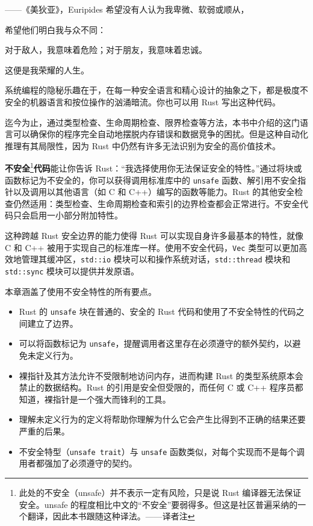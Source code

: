 
\begin{myEpigraph}{——《美狄亚》，Euripides}
希望没有人认为我卑微、软弱或顺从，

希望他们明白我与众不同：

对于敌人，我意味着危险；对于朋友，我意味着忠诚。

这便是我荣耀的人生。
\end{myEpigraph}

系统编程的隐秘乐趣在于，在每一种安全语言和精心设计的抽象之下，都是极度不安全的机器语言和按位操作的汹涌暗流。你也可以用 Rust 写出这种代码。

迄今为止，通过类型检查、生命周期检查、限界检查等方法，本书中介绍的这门语言可以确保你的程序完全自动地摆脱内存错误和数据竞争的困扰。但是这种自动化推理有其局限性，因为 Rust 中仍然有许多无法识别为安全的高价值技术。

\textbf{不安全}\footnote{此处的不安全（unsafe）并不表示一定有风险，只是说 Rust 编译器无法保证安全。unsafe 的程度相比中文的“不安全”要弱得多。但这是社区普遍采纳的一个翻译，因此本书跟随这种译法。——译者注}\textbf{代码}能让你告诉 Rust：“我选择使用你无法保证安全的特性。”通过将块或函数标记为不安全的，你可以获得调用标准库中的 \texttt{unsafe} 函数、解引用不安全指针以及调用以其他语言（如 C 和 C++）编写的函数等能力。Rust 的其他安全检查仍然适用：类型检查、生命周期检查和索引的边界检查都会正常进行。不安全代码只会启用一小部分附加特性。

这种跨越 Rust 安全边界的能力使得 Rust 可以实现自身许多最基本的特性，就像 C 和 C++ 被用于实现自己的标准库一样。使用不安全代码，\texttt{Vec} 类型可以更加高效地管理其缓冲区，\texttt{std::io} 模块可以和操作系统对话，\texttt{std::thread} 模块和 \texttt{std::sync} 模块可以提供并发原语。

本章涵盖了使用不安全特性的所有要点。

\begin{itemize}
\item Rust 的 \texttt{unsafe} 块在普通的、安全的 Rust 代码和使用了不安全特性的代码之间建立了边界。
\item 可以将函数标记为 \texttt{unsafe}，提醒调用者这里存在必须遵守的额外契约，以避免未定义行为。
\item 裸指针及其方法允许不受限制地访问内存，进而构建 Rust 的类型系统原本会禁止的数据结构。Rust 的引用是安全但受限的，而任何 C 或 C++ 程序员都知道，裸指针是一个强大而锋利的工具。
\item 理解未定义行为的定义将帮助你理解为什么它会产生比得到不正确的结果还要严重的后果。
\item 不安全特型（\texttt{unsafe trait}）与 \texttt{unsafe} 函数类似，对每个实现而不是每个调用者都强加了必须遵守的契约。
\end{itemize}

